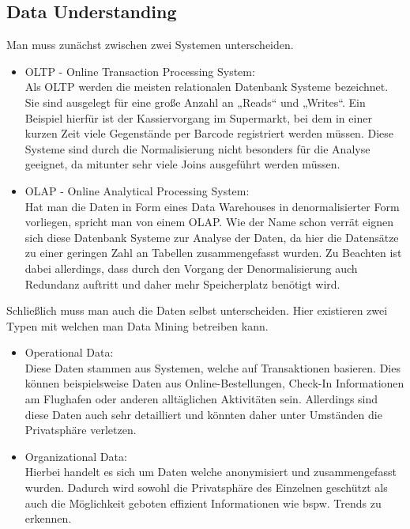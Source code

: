 \subsection{Data Understanding}
\label{sec:process:crispdm:du}

Man muss zunächst zwischen zwei Systemen unterscheiden.
\begin{itemize}
  \item OLTP - Online Transaction Processing System: \\
  Als OLTP werden die meisten relationalen Datenbank Systeme bezeichnet. Sie
  sind ausgelegt für eine große Anzahl an „Reads“ und „Writes“. Ein Beispiel
  hierfür ist der Kassiervorgang im Supermarkt, bei dem in einer kurzen Zeit
  viele Gegenstände per Barcode registriert werden müssen. Diese Systeme sind
  durch die Normalisierung nicht besonders für die Analyse geeignet, da mitunter
  sehr viele Joins ausgeführt werden müssen.
  \item OLAP - Online Analytical Processing System:  \\
  Hat man die Daten in Form eines Data Warehouses in denormalisierter Form
  vorliegen, spricht man von einem OLAP. Wie der Name schon verrät eignen sich
  diese Datenbank Systeme zur Analyse der Daten, da hier die Datensätze zu einer
  geringen Zahl an Tabellen zusammengefasst wurden. Zu Beachten ist dabei
  allerdings, dass durch den Vorgang der Denormalisierung auch Redundanz
  auftritt und daher mehr Speicherplatz benötigt wird.
\end{itemize}

Schließlich muss man auch die Daten selbst unterscheiden. Hier existieren zwei
Typen mit welchen man Data Mining betreiben kann.
\begin{itemize}
  \item Operational Data:  \\
  Diese Daten stammen aus Systemen, welche auf Transaktionen basieren. Dies
  können beispielsweise Daten aus Online-Bestellungen, Check-In Informationen am
  Flughafen oder anderen alltäglichen Aktivitäten sein. Allerdings sind diese
  Daten auch sehr detailliert und könnten daher unter Umständen die Privatsphäre
  verletzen.
  \item Organizational Data:  \\
  Hierbei handelt es sich um Daten welche anonymisiert und zusammengefasst
  wurden. Dadurch wird sowohl die Privatsphäre des Einzelnen geschützt als auch
  die Möglichkeit geboten effizient Informationen wie bspw. Trends zu erkennen.
\end{itemize}

